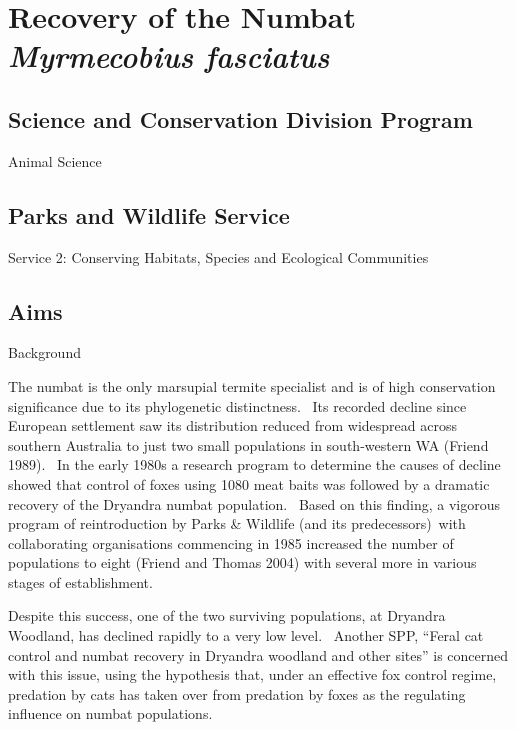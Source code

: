 \documentclass[version=last,
    paper=a4, %
    10pt, %
    usenames,
    dvipsnames,
    oneside, %
    headings=openany, %
    DIV=15 %
]{scrbook}
\begin{document}
\section*{Recovery of the Numbat \emph{Myrmecobius fasciatus}
}



\subsection*{Science and Conservation Division Program}

Animal Science




\subsection*{Parks and Wildlife Service}

Service 2: Conserving Habitats, Species and Ecological Communities




\subsection*{Aims}

Background

The numbat is the only marsupial termite specialist and is of high
conservation significance due to its phylogenetic distinctness.~ Its
recorded decline since European settlement saw its distribution reduced
from widespread across southern Australia to just two small populations
in south-western WA (Friend 1989).~ In the early 1980s a research
program to determine the causes of decline showed that control of foxes
using 1080 meat baits was followed by a dramatic recovery of the
Dryandra numbat population.~ Based on this finding, a vigorous program
of reintroduction by Parks \& Wildlife (and its predecessors)~with
collaborating organisations commencing in 1985 increased the number of
populations to eight (Friend and Thomas 2004) with several more in
various stages of establishment. ~

Despite this success, one of the two surviving populations, at Dryandra
Woodland, has declined rapidly to a very low level.~ Another SPP,
``Feral cat control and numbat recovery in Dryandra woodland and other
sites'' is concerned with this issue, using the hypothesis that, under
an effective fox control regime, predation by cats has taken over from
predation by foxes as the regulating influence on numbat populations. ~
\end{document}
